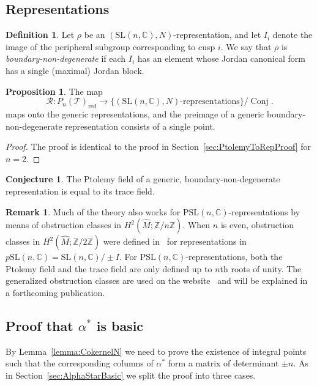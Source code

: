 \documentclass[12pt]{amsart}
\theoremstyle{definition}
\newtheorem{proposition}[theorem]{Proposition}
\newtheorem{definition}[theorem]{Definition}
\newtheorem{remark}[theorem]{Remark}
\newtheorem{conjecture}[theorem]{Conjecture}
\numberwithin{equation}{section}
\def\SL{\mathrm{SL}}
\def\PSL{\mathrm{PSL}}
\DeclareMathOperator{\Conj}{Conj}
\def\Z{\mathbb{Z}}
\def\C{\mathbb{C}}
\def\T{\mathcal{T}}
\def\rd{\mathrm{red}}
\begin{document}
\subsection{Representations}
\begin{definition}\label{def:BoundaryNonDeg}
Let $\rho$ be an $(\SL(n,\C),N)$-representation, and let $I_i$ denote the image of the peripheral subgroup corresponding to cusp $i$. We say that $\rho$ is \emph{boundary-non-degenerate} if each $I_i$ has an element whose Jordan canonical form has a single (maximal) Jordan block.
\end{definition}
\begin{proposition}
The map 
\begin{equation}
\mathcal R\colon P_n(\T)_\rd\to \big\{(\SL(n,\C),N)\text{-representations}\big\}
\big/\Conj.
\end{equation}
maps onto the generic representations, and the preimage of a generic boundary-non-degenerate representation consists of a single point.
\end{proposition}
\begin{proof}
The proof is identical to the proof in Section~\ref{sec:PtolemyToRepProof} for $n=2$.
\end{proof}
\begin{conjecture}
The Ptolemy field of a generic, boundary-non-degenerate representation is equal to its trace field.
\end{conjecture}

\begin{remark}Much of the theory also works for $\PSL(n,\C)$-representations by means of obstruction classes in $H^2(\widehat M;\Z/n\Z)$. When $n$ is even, obstruction classes in $H^2(\widehat M;\Z/2\Z)$ were defined in~\cite{GaroufalidisThurstonZickert} for representations in $p\SL(n,\C)=\SL(n,\C)/\pm I$. 
For $\PSL(n,\C)$-representations, both the Ptolemy field and the trace field are only defined up to $n$th roots of unity.
The generalized obstruction classes are used on the website~\cite{Unhyperbolic} and will be explained in a forthcoming publication. 
\end{remark}

\subsection{Proof that $\alpha^*$ is basic}\label{sec:AlphaStarBasicGeneral}
By Lemma~\ref{lemma:CokernelN} we need to prove the existence of integral points such that the corresponding columns of $\alpha^*$ form a matrix of determinant $\pm n$. As in Section~\ref{sec:AlphaStarBasic} we split the proof into three cases.
\end{document}
